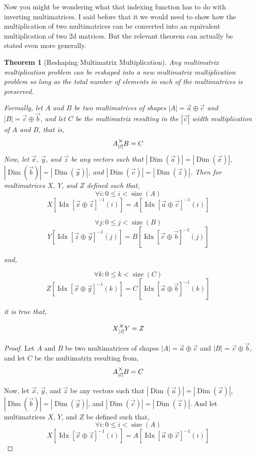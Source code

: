 \documentclass[12pt]{book}
\theoremstyle{plain}
\newtheorem{theorem}{Theorem}[chapter]
\theoremstyle{definition}
\theoremstyle{ppart}
\theoremstyle{case}
\theoremstyle{solution}
\DeclareMathOperator{\Dim}{Dim}
\DeclareMathOperator{\Idx}{Idx}
\DeclareMathOperator{\size}{size}
\newcommand{\mmult}[1]{\text{\raisebox{1ex}{$\underset{#1}{\times}$}}}
\newcommand{\shape}[1]{\left|#1\right|}
\begin{document}
\begin{landscape}
Now you might be wondering what that indexing function has to do with inverting
multimatrices. I said before that it we would need to show how the multiplication
of two multimatrices can be converted into an equivalent multiplication of two
2d matrices. But the relevant theorem can actually be stated even more generally.

\begin{theorem}[Reshaping Multimatrix Multiplication]
Any multimatrix multiplication problem can be reshaped into a new multimatrix
multiplication problem so long as the total number of elements in each of the multimatrices
is preserved.

Formally, let $A$ and $B$ be two multimatrices of shapes $\shape{A} = \vec{a} \oplus \vec{c}$ and
$\shape{B} = \vec{c} \oplus \vec{b}$, and let $C$ be the multimatrix resulting in the $\shape{\vec{c}}$
width multiplication of $A$ and $B$, that is,
\[ A \mmult{\shape{\vec{c}}} B = C \]
Now, let $\vec{x}$, $\vec{y}$, and $\vec{z}$ be any vectors such that
$\shape{\Dim(\vec{a})} = \shape{\Dim(\vec{x})}$,
$\shape{\Dim(\vec{b})} = \shape{\Dim(\vec{y})}$,
and 
$\shape{\Dim(\vec{c})} = \shape{\Dim(\vec{z})}$.
Then for multimatrices $X$, $Y$, and $Z$ defined such that,
\[\forall i : 0 \le i < \size(A) \]
\[ X[\Idx[\vec{x} \oplus \vec{z}]^{-1}(i)] = A[\Idx[\vec{a} \oplus \vec{c}]^{-1}(i)] \]

\[\forall j : 0 \le j < \size(B)\]
\[ Y[\Idx[\vec{z} \oplus \vec{y}]^{-1}(j)] = B[\Idx[\vec{c} \oplus \vec{b}]^{-1}(j)] \]

and,

\[\forall k : 0 \le k < \size(C)\]
\[ Z[\Idx[\vec{x} \oplus \vec{y}]^{-1}(k)] = C[\Idx[\vec{a} \oplus \vec{b}]^{-1}(k)] \]

it is true that,

\[ X \mmult{\shape{\vec{z}}} Y = Z \]
\end{theorem}
\begin{proof}
Let $A$ and $B$ be two multimatrices of shapes $\shape{A} = \vec{a} \oplus \vec{c}$ and
$\shape{B} = \vec{c} \oplus \vec{b}$, and let $C$ be the multimatrix resulting from,
\[ A \mmult{\shape{\vec{c}}} B = C \]

Now, let $\vec{x}$, $\vec{y}$, and $\vec{z}$ be any vectors such that
$\shape{\Dim(\vec{a})} = \shape{\Dim(\vec{x})}$,
$\shape{\Dim(\vec{b})} = \shape{\Dim(\vec{y})}$,
and 
$\shape{\Dim(\vec{c})} = \shape{\Dim(\vec{z})}$.
And let multimatrices $X$, $Y$, and $Z$ be defined such that,
\[\forall i : 0 \le i < \size(A) \]
\[ X[\Idx[\vec{x} \oplus \vec{z}]^{-1}(i)] = A[\Idx[\vec{a} \oplus \vec{c}]^{-1}(i)] \]


\end{proof}
\end{landscape}
\end{document}

